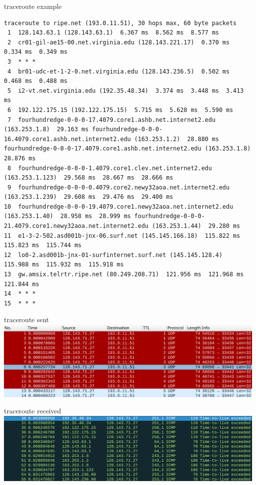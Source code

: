 \begin{frame}{traceroute example}
\begin{Verbatim}[fontsize=\small]
traceroute to ripe.net (193.0.11.51), 30 hops max, 60 byte packets
 1  128.143.63.1 (128.143.63.1)  6.367 ms  8.562 ms  8.577 ms
 2  cr01-gil-ae15-00.net.virginia.edu (128.143.221.17)  0.370 ms  0.334 ms  0.349 ms
 3  * * *
 4  br01-udc-et-1-2-0.net.virginia.edu (128.143.236.5)  0.502 ms  0.468 ms  0.488 ms
 5  i2-vt.net.virginia.edu (192.35.48.34)  3.374 ms  3.448 ms  3.413 ms
 6  192.122.175.15 (192.122.175.15)  5.715 ms  5.628 ms  5.590 ms
 7  fourhundredge-0-0-0-17.4079.core1.ashb.net.internet2.edu (163.253.1.8)  29.163 ms fourhundredge-0-0-0-16.4079.core1.ashb.net.internet2.edu (163.253.1.2)  28.880 ms fourhundredge-0-0-0-17.4079.core1.ashb.net.internet2.edu (163.253.1.8)  28.876 ms
 8  fourhundredge-0-0-0-1.4079.core1.clev.net.internet2.edu (163.253.1.123)  29.568 ms  28.667 ms  28.666 ms
 9  fourhundredge-0-0-0-0.4079.core2.newy32aoa.net.internet2.edu (163.253.1.239)  29.608 ms  29.476 ms  29.400 ms
10  fourhundredge-0-0-0-19.4079.core1.newy32aoa.net.internet2.edu (163.253.1.40)  28.958 ms  28.999 ms fourhundredge-0-0-0-21.4079.core1.newy32aoa.net.internet2.edu (163.253.1.44)  29.280 ms
11  e1-3-2-502.asd001b-jnx-06.surf.net (145.145.166.18)  115.822 ms  115.823 ms  115.744 ms
12  lo0-2.asd001b-jnx-01-surfinternet.surf.net (145.145.128.4)  115.988 ms  115.932 ms  115.918 ms
13  gw.amsix.telrtr.ripe.net (80.249.208.71)  121.956 ms  121.968 ms  121.844 ms
14  * * *
15  * * *
\end{Verbatim}
\end{frame}

\begin{frame}{traceroute sent}
\includegraphics[width=\textwidth]{traceroute-v4-send}
\end{frame}

\begin{frame}{traceroute received}
\includegraphics[width=\textwidth]{traceroute-v4-recv}
\end{frame}

